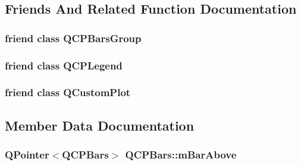 \subsection{Friends And Related Function Documentation}
\hypertarget{class_q_c_p_bars_ae1051b4d58a2786cb420367a586e2fee}{}
\subsubsection[{Q\+C\+P\+Bars\+Group}]{\setlength{\rightskip}{0pt plus 5cm}friend class {\bf Q\+C\+P\+Bars\+Group}\hspace{0.3cm}{\ttfamily [friend]}}\label{class_q_c_p_bars_ae1051b4d58a2786cb420367a586e2fee}
\hypertarget{class_q_c_p_bars_a8429035e7adfbd7f05805a6530ad5e3b}{}
\subsubsection[{Q\+C\+P\+Legend}]{\setlength{\rightskip}{0pt plus 5cm}friend class {\bf Q\+C\+P\+Legend}\hspace{0.3cm}{\ttfamily [friend]}}\label{class_q_c_p_bars_a8429035e7adfbd7f05805a6530ad5e3b}
\hypertarget{class_q_c_p_bars_a1cdf9df76adcfae45261690aa0ca2198}{}
\subsubsection[{Q\+Custom\+Plot}]{\setlength{\rightskip}{0pt plus 5cm}friend class {\bf Q\+Custom\+Plot}\hspace{0.3cm}{\ttfamily [friend]}}\label{class_q_c_p_bars_a1cdf9df76adcfae45261690aa0ca2198}


\subsection{Member Data Documentation}
\hypertarget{class_q_c_p_bars_a0c1c46076c41a478dbb373cfd35929aa}{}
\subsubsection[{m\+Bar\+Above}]{\setlength{\rightskip}{0pt plus 5cm}Q\+Pointer$<${\bf Q\+C\+P\+Bars}$>$ Q\+C\+P\+Bars\+::m\+Bar\+Above\hspace{0.3cm}{\ttfamily [protected]}}\label{class_q_c_p_bars_a0c1c46076c41a478dbb373cfd35929aa}
\hypertarget{class_q_c_p_bars_ad51db970eed7e286f2753b0216fc56de}{}
